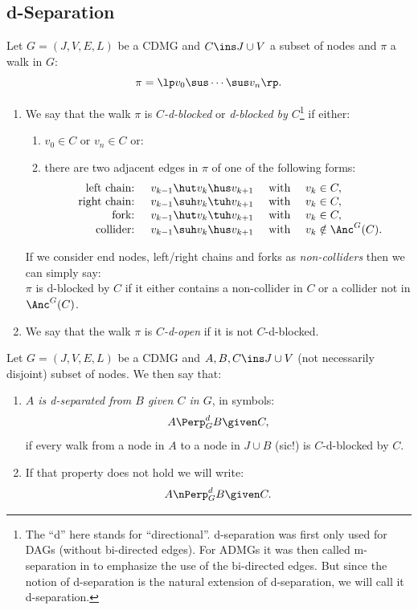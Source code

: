 \subsection{d-Separation}

\begin{Def}\label{def:d-blocking}
      Let $G=(J,V,E,L)$ be a CDMG and $C \ins J \cup V$ a subset of nodes and $\pi$ a walk in $G$:
      \[ \pi =\lp  v_0 \sus \cdots \sus v_n \rp.  \]
      \begin{enumerate}
          \item
              We say that the walk $\pi$ is \emph{$C$-d-blocked} or \emph{d-blocked by $C$}\footnote{The ``d'' here stands for ``directional''. d-separation was first only used for DAGs (without bi-directed edges).  For ADMGs it was then called m-separation in \cite{Ric03} to emphasize the use of the bi-directed edges. But since the notion of d-separation is the natural extension of d-separation, we will call it d-separation.} 
              if either:
      \begin{enumerate}[label=\roman*.)]
          \item $v_0 \in C$ or $v_n \in C$ or:
          \item there are two adjacent edges in $\pi$ of one of the following forms:
              \[\begin{array}{rccl}
           \text{ left chain: } & v_{k-1} \hut v_k \hus v_{k+1} & \text{ with } & v_k \in C,\\
           \text{ right chain: } & v_{k-1} \suh v_k \tuh v_{k+1} & \text{ with } & v_k \in C,\\
           \text{ fork: } & v_{k-1} \hut v_k \tuh v_{k+1} & \text{ with } & v_k \in C,\\
           \text{ collider: } & v_{k-1} \suh v_k \hus v_{k+1} & \text{ with } & v_k \notin \Anc^G(C).
              \end{array}\]
      \end{enumerate}
      If we consider end nodes, left/right chains and forks as \emph{non-colliders} then we can simply say:\\
      $\pi$ is d-blocked by $C$ if it either contains a non-collider in $C$ or a collider not in $\Anc^G(C)$.
          \item We say that the walk $\pi$ is \emph{$C$-d-open} if it is not $C$-d-blocked.
      \end{enumerate}
\end{Def}

\begin{Def}[d-separation]
    Let $G=(J,V,E,L)$ be a CDMG and $A,B,C \ins J \cup V$ (not necessarily disjoint) subset of nodes.
    We then say that:
    \begin{enumerate}
        \item \emph{$A$ is d-separated from $B$ given $C$ in $G$}, in symbols:
    \[ A \Perp^d_G B \given C,  \]
    if every walk from a node in $A$ to a node in $J \cup B$ (sic!) is $C$-d-blocked by $C$.
        \item If that property does not hold we will write:
            \[ A \nPerp^d_G B \given C.\]
    \end{enumerate}
\end{Def}

